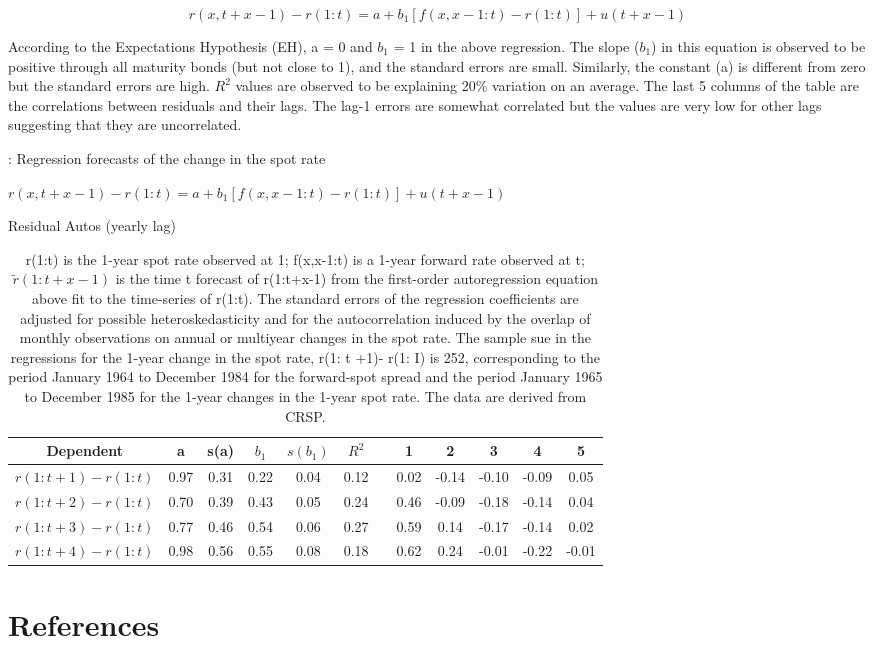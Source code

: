 \documentclass[11pt]{article}
\begin{document}
\begin{equation} \label{eq8}
r(x,t+x-1)-r(1:t)=a+b_{1}[f(x,x-1:t)-r(1:t)]+u(t+x-1)
\end{equation}

According to the Expectations Hypothesis (EH), a = 0 and $b_{1}$ = 1 in the above regression. The slope ($b_{1}$) in this equation is observed to be positive through all maturity bonds (but not close to 1), and the standard errors are small. Similarly, the constant (a) is different from zero but the standard errors are high. $R^{2}$ values are observed to be explaining 20\% variation on an average. The last 5 columns of the table are the correlations between residuals and their lags. The lag-1 errors are somewhat correlated but the values are very low for other lags suggesting that they are uncorrelated.

\begin{table}[H]
\centering
\caption{: Regression forecasts of the change in the spot rate} \label{tab:FB2}
\caption*{$r(x,t+x-1)-r(1:t)=a+b_{1}[f(x,x-1:t)-r(1:t)]+u(t+x-1)$}
\caption*{r(1:t) is the 1-year spot rate observed at 1; f(x,x-1:t) is a 1-year forward rate observed at t; $\tilde{r}(1:t+x-1)$ is the time t forecast of r(1:t+x-1) from the first-order autoregression equation above fit to the time-series of r(1:t). The
standard errors of the regression coefficients are adjusted for possible heteroskedasticity and for the autocorrelation induced by the overlap of monthly observations on annual or multiyear changes in the spot rate. The sample sue in the regressions for the 1-year change in the spot rate, r(1: t +1)- r(1: I) is 252, corresponding to the period January 1964 to December 1984 for the forward-spot spread and the period January 1965 to December 1985 for the 1-year changes in the 1-year spot rate. The data are derived from CRSP.}
\toprule
\hspace*{\fill} Residual Autos (yearly lag)
\begin{tabular}{cccccccccccc}
  \midrule
 Dependent & a & s(a) & $b_{1}$ & $s(b_{1})$ & $R^{2}$ &  & 1 & 2 & 3 & 4 & 5 \\
  \hline
$r(1:t+1)-r(1:t)$ & 0.97 & 0.31 & 0.22 & 0.04 & 0.12 & & 0.02 & -0.14 & -0.10 & -0.09 & 0.05 \\ 
  $r(1:t+2)-r(1:t)$ & 0.70 & 0.39 & 0.43 & 0.05 & 0.24 & & 0.46 & -0.09 & -0.18 & -0.14 & 0.04 \\
  $r(1:t+3)-r(1:t)$ & 0.77 & 0.46 & 0.54 & 0.06 & 0.27 & & 0.59 & 0.14 & -0.17 & -0.14 & 0.02 \\ 
  $r(1:t+4)-r(1:t)$ & 0.98 & 0.56 & 0.55 & 0.08 & 0.18 & & 0.62 & 0.24 & -0.01 & -0.22 & -0.01 \\ 
  \bottomrule
\end{tabular}
\end{table}

\clearpage

\section{References}
\begin{doublespacing}   %


\end{doublespacing}
\end{document}
